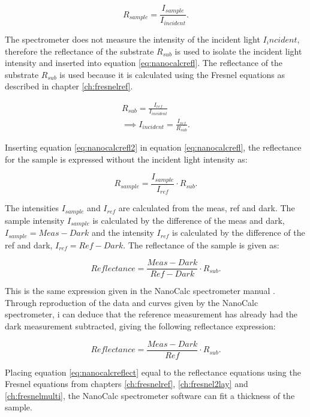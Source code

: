 \documentclass[MasterThesisMain.tex]{subfiles}
\begin{document}
\begin{equation}\label{eq:nanocalcrefl}
R_{sample} = \frac{I_{sample}}{I_{incident}}.
\end{equation}

The spectrometer does not measure the intensity of the incident light $I_incident$, therefore the reflectance of the substrate $R_{sub}$ is used to isolate the incident light intensity and inserted into equation \ref{eq:nanocalcrefl}. The reflectance of the substrate $R_{sub}$ is used because it is calculated using the Fresnel equations as described in chapter \ref{ch:fresnelref}.

\begin{align}
R_{sub} = \frac{I_{ref}}{I_{incident}}\\
\implies  I_{incident} = \frac{I_{ref}}{R_{sub}} \label{eq:nanocalcrefl2}.
\end{align}

Inserting equation \ref{eq:nanocalcrefl2} in equation \ref{eq:nanocalcrefl}, the reflectance for the sample is expressed without the incident light intensity as:

\begin{equation}
R_{sample} = \frac{I_{sample}}{I_{ref}} \cdot R_{sub}.
\end{equation}

The intensities $I_{sample}$ and $I_{ref}$ are calculated from the meas, ref and dark. The sample intensity $I_{sample}$ is calculated by the difference of the meas and dark, $I_{sample}=Meas-Dark$ and the intensity $I_{ref}$ is calculated by the difference of the ref and dark, $I_{ref}=Ref-Dark$. The reflectance of the sample is given as:

\begin{equation}
Reflectance = \frac{Meas-Dark}{Ref-Dark} \cdot R_{sub}.
\end{equation}

This is the same expression given in the NanoCalc spectrometer manual \cite{nanocalcmanual}. Through reproduction of the data and curves given by the NanoCalc spectrometer, i can deduce that the reference measurement has already had the dark measurement subtracted, giving the following reflectance expression:

\begin{equation}\label{eq:nanocalcreflect}
Reflectance = \frac{Meas-Dark}{Ref} \cdot R_{sub}.
\end{equation}

Placing equation \ref{eq:nanocalcreflect} equal to the reflectance equations using the Fresnel equations from chapters  \ref{ch:fresnelref}, \ref{ch:fresnel2lay} and \ref{ch:fresnelmulti}, the NanoCalc spectrometer software can fit a thickness of the sample.
\end{document}
